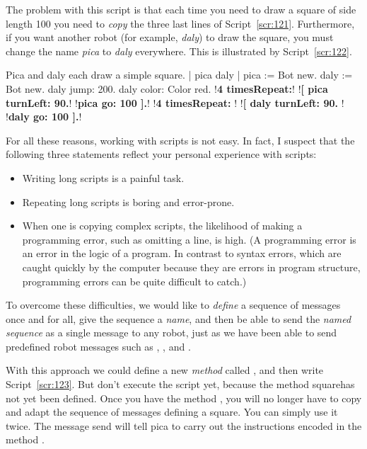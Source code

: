\documentclass[a4paper,10pt,twoside]{book}
\begin{document}
The problem with this script is that each time you need to draw a square of side length 
100 you need to \emph{copy} the three last lines of Script~\ref{scr:121}. Furthermore, if you want another robot 
(for example, \emph{daly}) to draw the square, you must change the name \emph{pica} to \emph{daly} everywhere. 
This is illustrated by Script~\ref{scr:122}. 

\begin{script}[122]{Pica and daly each draw a simple square.}
| pica daly | 
pica := Bot new. 
daly := Bot new. 
daly jump: 200. 
daly color: Color red. 
!\textbf{4 timesRepeat:}!
	!\textbf{[ pica turnLeft: 90.}!
	!\textbf{pica go: 100 ].}!
!\textbf{4 timesRepeat:} !
	!\textbf{[ daly turnLeft: 90.} !
	!\textbf{daly go: 100 ].}!
\end{script}

For all these reasons, working with scripts is not easy. In fact, I suspect that the following 
three statements reflect your personal experience with scripts: 

\begin{itemize}
\item Writing long scripts is a painful task. 
\item Repeating long scripts is boring and error-prone. 
\item When one is copying complex scripts, the likelihood of making a programming error, such as omitting a line, is high. (A programming error is an error in the logic of a program. In contrast to syntax errors, which are caught quickly by the computer because they are errors in program structure, programming errors can be quite difficult to catch.)
\end{itemize}

To overcome these difficulties, we would like to \emph{define} a sequence of messages once and 
for all, give the sequence a \emph{name}, and then be able to send the \emph{named sequence} as a single 
message to any robot, just as we have been able to send predefined robot messages such as 
, , and .

With this approach we could define a new \emph{method} called , and then write Script~\ref{scr:123}. 
But don’t execute the script yet, because the method squarehas not yet been defined. Once you 
have the method , you will no longer have to copy and adapt the sequence of messages 
defining a square. You can simply use it twice. The message send  will tell pica to 
carry out the instructions encoded in the method . 
\end{document}
